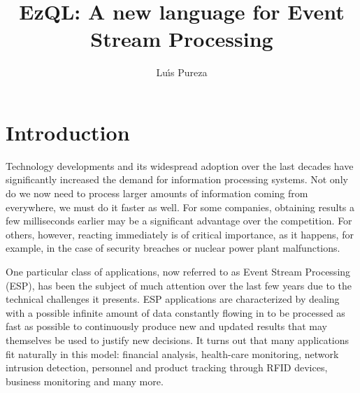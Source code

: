 \documentclass{report}
\begin{document}
\title{EzQL: A new language for Event Stream Processing}
\author{Lu\'{\i}s Pureza}

\maketitle

\tableofcontents

\addtolength{\parskip}{\baselineskip}
\chapter{Introduction}
\label{chap:introduction}

Technology developments and its widespread adoption over the last
decades have significantly increased the demand for information
processing systems. Not only do we now need to process larger amounts
of information coming from everywhere, we must do it faster as
well. For some companies, obtaining results a few milliseconds earlier
may be a significant advantage over the competition. For others,
however, reacting immediately is of critical importance, as it
happens, for example, in the case of security breaches or nuclear
power plant malfunctions.

One particular class of applications, now referred to as Event Stream
Processing (ESP), has been the subject of much attention over the last
few years due to the technical challenges it presents. ESP
applications are characterized by dealing with a possible infinite
amount of data constantly flowing in to be processed as fast as
possible to continuously produce new and updated results that may
themselves be used to justify new decisions. It turns out that many
applications fit naturally in this model: financial analysis,
health-care monitoring, network intrusion detection, personnel and
product tracking through RFID devices, business monitoring and many
more.
\end{document}
